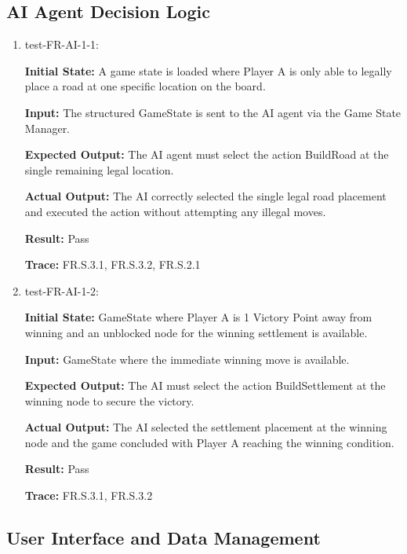 \documentclass[12pt, titlepage]{article}
\begin{document}
\subsection{AI Agent Decision Logic} 
\begin{enumerate}

\item test-FR-AI-1-1:

\textbf{Initial State:} A game state is loaded where Player A is only able to legally place a road at one specific location on the board.

\textbf{Input:} The structured GameState is sent to the AI agent via the Game State Manager.

\textbf{Expected Output:} The AI agent must select the action BuildRoad at the single remaining legal location.

\textbf{Actual Output:} The AI correctly selected the single legal road placement and executed the action without attempting any illegal moves.

\textbf{Result:} Pass

\textbf{Trace:} FR.S.3.1, FR.S.3.2, FR.S.2.1


\item test-FR-AI-1-2:

\textbf{Initial State:} GameState where Player A is 1 Victory Point away from winning and an unblocked node for the winning settlement is available.

\textbf{Input:} GameState where the immediate winning move is available.

\textbf{Expected Output:} The AI must select the action BuildSettlement at the winning node to secure the victory.

\textbf{Actual Output:} The AI selected the settlement placement at the winning node and the game concluded with Player A reaching the winning condition.

\textbf{Result:} Pass

\textbf{Trace:} FR.S.3.1, FR.S.3.2


\end{enumerate}



\subsection{User Interface and Data Management}
\end{document}
